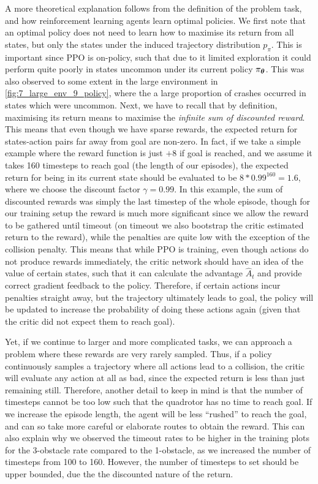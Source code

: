 A more theoretical explanation follows from the definition of the problem task, and how reinforcement learning agents learn optimal policies. We first note that an optimal policy does not need to learn how to maximise its return from all states, but only the states under the induced trajectory distribution $p_\pi$. This is important since PPO is on-policy, such that due to it limited exploration it could perform quite poorly in states uncommon under its current policy $\pi_{\boldsymbol{\theta}}$. This was also observed to some extent in the large environment in \cref{fig:7_large_env_9_policy}, where the a large proportion of crashes occurred in states which were uncommon. Next, we have to recall that by definition, maximising its return means to maximise the \textit{infinite sum of discounted reward}. This means that even though we have sparse rewards, the expected return for states-action pairs far away from goal are non-zero. In fact, if we take a simple example where the reward function is just $+8$ if goal is reached, and we assume it takes 160 timesteps to reach goal (the length of our episodes), the expected return for being in its current state should be evaluated to be $8*0.99^{160} = 1.6$, where we choose the discount factor $\gamma = 0.99$. In this example, the sum of discounted rewards was simply the last timestep of the whole episode, though for our training setup the reward is much more significant since we allow the reward to be gathered until timeout (on timeout we also bootstrap the critic estimated return to the reward), while the penalties are quite low with the exception of the collision penalty. This means that while PPO is training, even though actions do not produce rewards immediately, the critic network should have an idea of the value of certain states, such that it can calculate the advantage $\widehat{A}_t$ and provide correct gradient feedback to the policy.
Therefore, if certain actions incur penalties straight away, but the trajectory ultimately leads to goal, the policy will be updated to increase the probability of doing these actions again (given that the critic did not expect them to reach goal). 

Yet, if we continue to larger and more complicated tasks, we can approach a problem where these rewards are very rarely sampled. Thus, if a policy continuously samples a trajectory where all actions lead to a collision, the critic will evaluate any action at all as bad, since the expected return is less than just remaining still. Therefore, another detail to keep in mind is that the number of timesteps cannot be too low such that the quadrotor has no time to reach goal. If we increase the episode length, the agent will be less ``rushed'' to reach the goal, and can so take more careful or elaborate routes to obtain the reward. This can also explain why we observed the timeout rates to be higher in the training plots for the 3-obstacle rate compared to the 1-obstacle, as we increased the number of timesteps from 100 to 160. 
However, the number of timesteps to set should be upper bounded, due the the discounted nature of the return.

